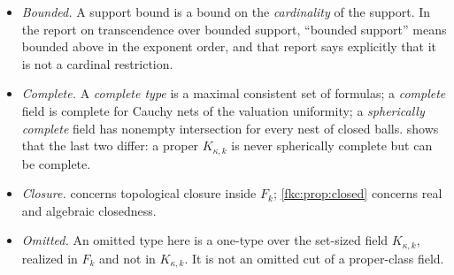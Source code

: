 \documentclass[11pt,letterpaper]{article}
\numberwithin{equation}{section}
\theoremstyle{definition}
\theoremstyle{remark}
\begin{document}
\begin{itemize}
\item \emph{Bounded.} A support bound is a bound on the \emph{cardinality} of the support. In the report on transcendence over bounded support, ``bounded support'' means bounded above in the exponent order, and that report says explicitly that it is not a cardinal restriction.
\item \emph{Complete.} A \emph{complete type} is a maximal consistent set of formulas; a \emph{complete} field is complete for Cauchy nets of the valuation uniformity; a \emph{spherically complete} field has nonempty intersection for every nest of closed balls.  shows that the last two differ: a proper $K_{\kappa,k}$ is never spherically complete but can be complete.
\item \emph{Closure.}  concerns topological closure inside $F_k$; \cref{fkc:prop:closed} concerns real and algebraic closedness.
\item \emph{Omitted.} An omitted type here is a one-type over the set-sized field $K_{\kappa,k}$, realized in $F_k$ and not in $K_{\kappa,k}$. It is not an omitted cut of a proper-class field.
\end{itemize}
\end{document}
